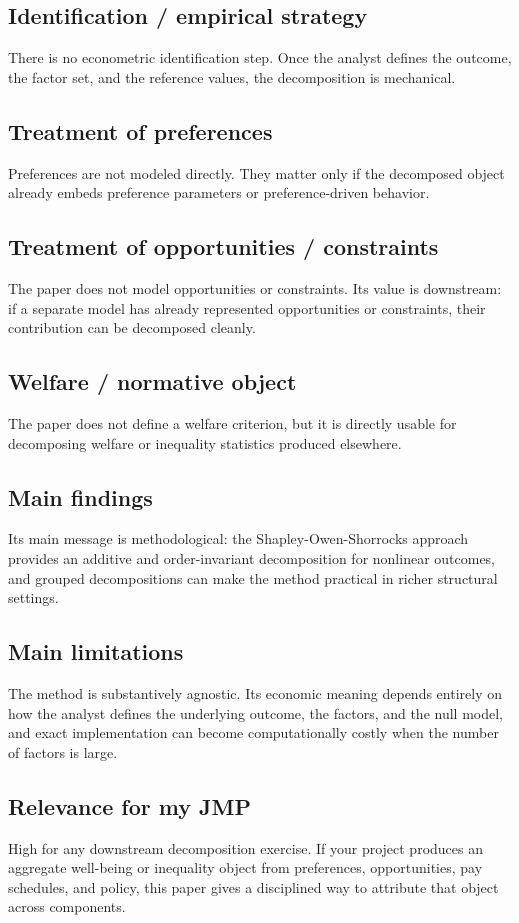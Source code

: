\documentclass[11pt,a4paper]{article}
\begin{document}
\subsection*{Identification / empirical strategy}
There is no econometric identification step. Once the analyst defines the outcome, the factor set, and the reference values, the decomposition is mechanical.

\subsection*{Treatment of preferences}
Preferences are not modeled directly. They matter only if the decomposed object already embeds preference parameters or preference-driven behavior.

\subsection*{Treatment of opportunities / constraints}
The paper does not model opportunities or constraints. Its value is downstream: if a separate model has already represented opportunities or constraints, their contribution can be decomposed cleanly.

\subsection*{Welfare / normative object}
The paper does not define a welfare criterion, but it is directly usable for decomposing welfare or inequality statistics produced elsewhere.

\subsection*{Main findings}
Its main message is methodological: the Shapley-Owen-Shorrocks approach provides an additive and order-invariant decomposition for nonlinear outcomes, and grouped decompositions can make the method practical in richer structural settings.

\subsection*{Main limitations}
The method is substantively agnostic. Its economic meaning depends entirely on how the analyst defines the underlying outcome, the factors, and the null model, and exact implementation can become computationally costly when the number of factors is large.

\subsection*{Relevance for my JMP}
High for any downstream decomposition exercise. If your project produces an aggregate well-being or inequality object from preferences, opportunities, pay schedules, and policy, this paper gives a disciplined way to attribute that object across components.
\end{document}
